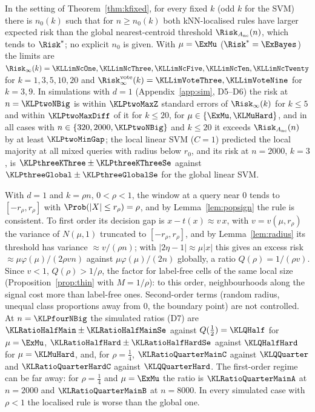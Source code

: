 \begin{corollary}\label{cor:kfixed}
In the setting of Theorem~\ref{thm:kfixed}, for every fixed $k$ (odd $k$ for the SVM) there is $n_0(k)$ such that for $n\ge n_0(k)$ both kNN-localised rules have larger expected risk than the global nearest-centroid threshold $\Risk_{A_{\mathrm{nc}}}(n)$, which tends to $\Risk^*$; no explicit $n_0$ is given. With $\mu=\ExMu$ ($\Risk^*=\ExBayes$) the limits are $\Risk_\infty(k)=\KLLimNcOne,\KLLimNcThree,\KLLimNcFive,\KLLimNcTen,\KLLimNcTwenty$ for $k=1,3,5,10,20$ and $\Risk^{\mathrm{vote}}_\infty(k)=\KLLimVoteThree,\KLLimVoteNine$ for $k=3,9$. In simulations with $d=1$ (Appendix~\ref{app:sim}, D5--D6) the risk at $n=\KLPtwoNBig$ is within $\KLPtwoMaxZ$ standard errors of $\Risk_\infty(k)$ for $k\le5$ and within $\KLPtwoMaxDiff$ of it for $k\le20$, for $\mu\in\{\ExMu,\KLMuHard\}$, and in all \KLPtwoNRows{} cases with $n\in\{320,2000,\KLPtwoNBig\}$ and $k\le20$ it exceeds $\Risk_{A_{\mathrm{nc}}}(n)$ by at least $\KLPtwoMinGap$; the local linear SVM ($C=1$) predicted the local majority at all \KLMajChecked{} mixed queries with radius below $r_0$, and its risk at $n=2000$, $k=3$, is $\KLPthreeKThree\pm\KLPthreeKThreeSe$ against $\KLPthreeGlobal\pm\KLPthreeGlobalSe$ for the global linear SVM.
\end{corollary}

\begin{remark}[Informative neighbourhoods with $k=\rho n$]\label{rem:rho}
With $d=1$ and $k=\rho n$, $0<\rho<1$, the window at a query near $0$ tends to $[-r_\rho,r_\rho]$ with $\Prob(|X|\le r_\rho)=\rho$, and by Lemma~\ref{lem:popsign} the rule is consistent. To first order its decision gap is $x-t(x)\approx v\,x$, with $v=v(\mu,r_\rho)$ the variance of $N(\mu,1)$ truncated to $[-r_\rho,r_\rho]$, and by Lemma~\ref{lem:radius} its threshold has variance $\approx v/(\rho n)$; with $|2\eta-1|\approx\mu|x|$ this gives an excess risk $\approx\mu\varphi(\mu)/(2\rho v n)$ against $\mu\varphi(\mu)/(2n)$ globally, a ratio $Q(\rho)=1/(\rho v)$. Since $v<1$, $Q(\rho)>1/\rho$, the factor for label-free cells of the same local size (Proposition~\ref{prop:thin} with $M=1/\rho$): to this order, neighbourhoods along the signal cost more than label-free ones. Second-order terms (random radius, unequal class proportions away from $0$, the boundary point) are not controlled. At $n=\KLPfourNBig$ the simulated ratios (D7) are $\KLRatioHalfMain\pm\KLRatioHalfMainSe$ against $Q(\tfrac12)=\KLQHalf$ for $\mu=\ExMu$, $\KLRatioHalfHard\pm\KLRatioHalfHardSe$ against $\KLQHalfHard$ for $\mu=\KLMuHard$, and, for $\rho=\tfrac14$, $\KLRatioQuarterMainC$ against $\KLQQuarter$ and $\KLRatioQuarterHardC$ against $\KLQQuarterHard$. The first-order regime can be far away: for $\rho=\tfrac14$ and $\mu=\ExMu$ the ratio is $\KLRatioQuarterMainA$ at $n=2000$ and $\KLRatioQuarterMainB$ at $n=8000$. In every simulated case with $\rho<1$ the localised rule is worse than the global one.
\end{remark}

